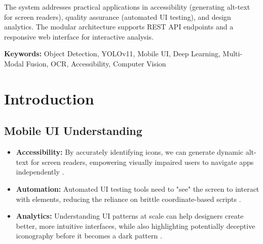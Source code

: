 \documentclass[11pt,a4paper]{report}
\begin{document}
\vspace{0.5cm}
\noindent The system addresses practical applications in accessibility (generating alt-text for screen readers), quality assurance (automated UI testing), and design analytics. The modular architecture supports REST API endpoints and a responsive web interface for interactive analysis.

\vspace{0.5cm}
\noindent\textbf{Keywords:} Object Detection, YOLOv11, Mobile UI, Deep Learning, Multi-Modal Fusion, OCR, Accessibility, Computer Vision

\newpage
\tableofcontents

\newpage
\listoffigures

\newpage
\listoftables

\chapter{Introduction}
\section{Mobile UI Understanding}
\begin{itemize}
    \item \textbf{Accessibility:} By accurately identifying icons, we can generate dynamic alt-text for screen readers, empowering visually impaired users to navigate apps independently \cite{multimodalaccessibility}.
    \item \textbf{Automation:} Automated UI testing tools need to "see" the screen to interact with elements, reducing the reliance on brittle coordinate-based scripts \cite{uiautomation}.
    \item \textbf{Analytics:} Understanding UI patterns at scale can help designers create better, more intuitive interfaces, while also highlighting potentially deceptive iconography before it becomes a dark pattern \cite{darkpatterns}.
\end{itemize}
\end{document}
